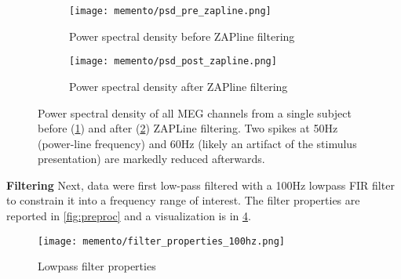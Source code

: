 \begin{figure}
	\begin{subfigure}{.49\textwidth}
		\texttt{[image: memento/psd\_pre\_zapline.png]}
		\caption{Power spectral density before ZAPline filtering}
		\label{fig:prezap}
	\end{subfigure}
	\begin{subfigure}{.49\textwidth}
		\texttt{[image: memento/psd\_post\_zapline.png]}
		\caption{Power spectral density after ZAPline filtering}
		\label{fig:postzap}
	\end{subfigure}
	\caption[Power spectral density before and after ZAPLine filtering]{Power spectral density of all MEG channels
		from a single subject before (\ref{fig:prezap}) and after (\ref{fig:postzap}) ZAPLine filtering.
		Two spikes at 50Hz (power-line frequency) and 60Hz (likely an artifact of the stimulus presentation) are markedly reduced afterwards. 
	}
	\label{fig:zapline_psd}
\end{figure}

\textbf{Filtering} Next, data were first low-pass filtered with a 100Hz lowpass FIR filter to constrain it into a frequency range of interest.
The filter properties are reported in \ref{fig:preproc} and a visualization is in \ref{fig:filter}.

\begin{figure}
	\texttt{[image: memento/filter\_properties\_100hz.png]}
	\caption[Lowpass filter properties]{Lowpass filter properties}
	\label{fig:filter}
\end{figure}



